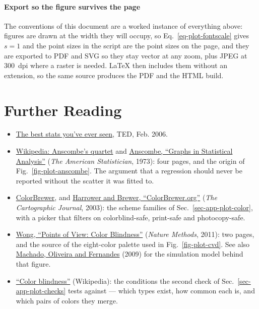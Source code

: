\paragraph{Export so the figure survives the page}
The conventions of this document are a worked instance of everything above: figures are drawn at the width they will occupy, so Eq.~\eqref{eq-plot-fontscale} gives $s = 1$ and the point sizes in the script are the point sizes on the page, and they are exported to PDF and SVG so they stay vector at any zoom, plus JPEG at $300$~dpi where a raster is needed. LaTeX then includes them without an extension, so the same source produces the PDF and the HTML build.


\section*{Further Reading}
\begin{itemize}
	\item \href{https://www.ted.com/talks/hans_rosling_the_best_stats_you_ve_ever_seen}{The best stats you've ever seen}, TED, Feb. 2006.
	\item \href{https://en.wikipedia.org/wiki/Anscombe%27s_quartet}{Wikipedia: Anscombe's quartet} and
	\href{https://doi.org/10.1080/00031305.1973.10478966}{Anscombe, ``Graphs in Statistical Analysis''} (\emph{The American Statistician}, 1973): four pages, and the origin of Fig.~\ref{fig-plot-anscombe}. The argument that a regression should never be reported without the scatter it was fitted to.
	\item \href{https://colorbrewer2.org}{ColorBrewer}, and \href{https://doi.org/10.1179/000870403235002042}{Harrower and Brewer, ``ColorBrewer.org''} (\emph{The Cartographic Journal}, 2003): the scheme families of Sec.~\ref{sec-app-plot-color}, with a picker that filters on colorblind-safe, print-safe and photocopy-safe.
	\item \href{https://www.nature.com/articles/nmeth.1618}{Wong, ``Points of View: Color Blindness''} (\emph{Nature Methods}, 2011): two pages, and the source of the eight-color palette used in Fig.~\ref{fig-plot-cvd}. See also \href{https://doi.org/10.1109/TVCG.2009.113}{Machado, Oliveira and Fernandes} (2009) for the simulation model behind that figure.
	\item \href{https://en.wikipedia.org/wiki/Color_blindness}{``Color blindness''} (Wikipedia): the conditions the second check of Sec.~\ref{sec-app-plot-checks} tests against --- which types exist, how common each is, and which pairs of colors they merge.
\end{itemize}


